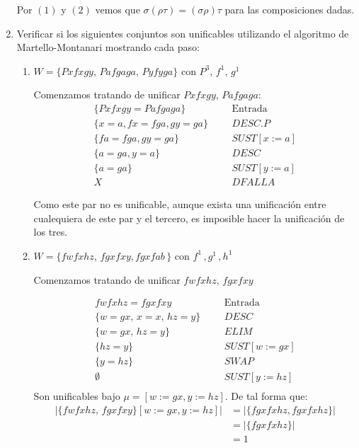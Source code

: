 \documentclass[8pt, letterpaper]{article}
\begin{document}
\begin{enumerate}
  Por $(1)$ y $(2)$ vemos que $\sigma(\rho\tau) = (\sigma\rho)\tau$ para las
  composiciones dadas.
  
\item Verificar si los siguientes conjuntos son unificables utilizando el
  algoritmo de Martello-Montanari mostrando cada paso:
  \begin{enumerate}
  \item $W = \{Pxfxgy,\, Pafgaga,\, Pyfyga\}$ con $P^3,\, f^1,\, g^1$

    Comenzamos tratando de unificar $Pxfxgy,\, Pafgaga$:
    \begin{align*}
      \{Pxfxgy = Pafgaga\}& & &\text{Entrada}\\
      \{x = a, fx =fga, gy=ga\}& & &DESC.P\\
      \{fa =fga, gy=ga\}& & &SUST[x:=a]\\
      \{a =ga, y=a\}& & &DESC\\
      \{a =ga\}& & &SUST[y:=a]\\
      X& & &DFALLA
    \end{align*}
    
    Como este par no es unificable, aunque exista una unificación entre
    cualequiera de este par y el tercero,
    es imposible hacer la unificación de los tres.
    
  \item $W = \{fwfxhz,\, fgxfxy, fgxfab\,\}$ con $f^1\,,g^1\,,h^1$

    Comenzamos tratando de unificar $fwfxhz,\, fgxfxy$

    \begin{align*}
      fwfxhz=fgxfxy& & &\text{Entrada}\\
      \{w = gx,\, x = x,\,hz = y\}& & &DESC\\
      \{w = gx,\,hz = y\}& & &ELIM\\
      \{hz = y\}& & &SUST[w:= gx]\\
      \{y=hz\}& & &SWAP\\
      \emptyset& & &SUST[y:= hz]\\
    \end{align*}
    Son unificables bajo $\mu = [w:= gx, y:= hz]$. De tal forma que:
    \begin{align*}
      |\{fwfxhz,\,fgxfxy\}[w:= gx, y:= hz]| &= |\{fgxfxhz, fgxfxhz\}|\\
      &=  |\{fgxfxhz\}| \\
      &= 1
    \end{align*}


\end{enumerate}
\end{enumerate}
\end{document}
